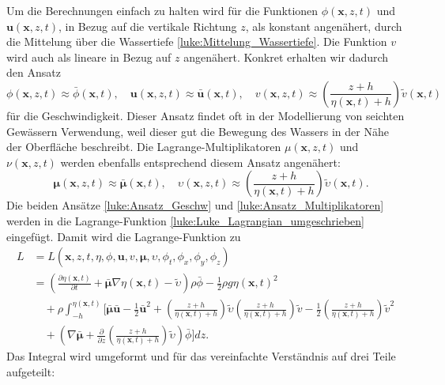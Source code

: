 Um die Berechnungen einfach zu halten wird für die Funktionen $\phi (\bm{x},z,t)$ und $\bm{u} (\bm{x},z,t)$, in Bezug auf die vertikale Richtung $z$, als konstant angenähert, durch die Mittelung über die Wassertiefe \eqref{luke:Mittelung_Wassertiefe}.
Die Funktion $v$ wird auch als lineare in Bezug auf $z$ angenähert. 
Konkret erhalten wir dadurch den Ansatz
\begin{equation}
	\phi(\bm{x},z,t) \approx \bar{\phi}(\bm{x}, t), \quad \bm{u}(\bm{x},z,t) \approx \bar{\bm{u}}(\bm{x}, t), \quad v(\bm{x},z,t) \approx \left(\frac{z + h}{\eta(\bm{x}, t) + h}\right) \tilde{v}(\bm{x}, t)
	\label{luke:Ansatz_Geschw}
\end{equation}
für die Geschwindigkeit.
Dieser Ansatz findet oft in der Modellierung von seichten Gewässern Verwendung, weil dieser gut die Bewegung des Wassers in der Nähe der Oberfläche beschreibt.
Die Lagrange-Multiplikatoren $\mu(\bm{x},z,t)$ und $\nu(\bm{x},z,t)$ werden ebenfalls entsprechend diesem Ansatz angenähert:
\begin{equation}
	\quad \bm{\mu}(\bm{x},z,t) \approx \bar{\bm{\mu}}(\bm{x}, t), \quad \upsilon(\bm{x},z,t) \approx \left(\frac{z + h}{\eta(\bm{x}, t) + h}\right)\tilde{\upsilon}(\bm{x}, t).
	\label{luke:Ansatz_Multiplikatoren}
\end{equation}
Die beiden Ansätze \eqref{luke:Ansatz_Geschw} und \eqref{luke:Ansatz_Multiplikatoren} werden in die Lagrange-Funktion \eqref{luke:Luke_Lagrangian_umgeschrieben} eingefügt.
Damit wird die Lagrange-Funktion zu
\begin{align*}
	L&=
	L(\bm{x},z,t,\eta,\phi,\bm{u}, v, \bm{\mu},\upsilon,\phi_t,\phi_x,\phi_y,\phi_z)
	\\
	&=
	\left(\frac{\partial \eta(\bm{x}, t)}{\partial t}
	+
	\bar{\bm{\mu}}  \nabla \eta(\bm{x}, t)
	-
	\widetilde{\upsilon}\right)\rho \bar{\phi}
	-
	\frac{1}{2} \rho g \eta(\bm{x}, t)^2
	\\
	&\quad+
	\rho\int_{-h}^{\eta(\bm{x}, t)} \Bigg[ \bar{\bm{\mu}}  \bar{\bm{u}} - \frac{1}{2} \bar{\bm{u}}^2 +\left(\frac{z + h}{\eta(\bm{x}, t) + h}\right)\tilde{\upsilon} \left(\frac{z + h}{\eta(\bm{x}, t) + h}\right)\tilde{v} - \frac{1}{2} \left(\frac{z + h}{\eta(\bm{x}, t) + h}\right)\tilde{v}^2 
	\\
	&\quad+\left(\nabla \bar{\bm{\mu}} + \frac{\partial}{\partial z} \left(\frac{z + h}{\eta(\bm{x}, t) + h}\right)\tilde{\upsilon}\right) \bar{\phi} \Bigg] dz.
\end{align*}
Das Integral wird umgeformt und für das vereinfachte Verständnis auf drei Teile aufgeteilt:
